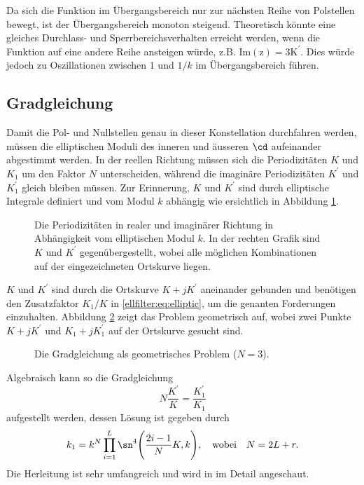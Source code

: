 Da sich die Funktion im Übergangsbereich nur zur nächsten Reihe von Polstellen bewegt, ist der Übergangsbereich monoton steigend.
Theoretisch könnte eine gleiches Durchlass- und Sperrbereichsverhalten erreicht werden, wenn die Funktion auf eine andere Reihe ansteigen würde, z.B. $\mathrm{Im(z) = 3K^\prime}$.
Dies würde jedoch zu Oszillationen zwischen $1$ und $1/k$ im Übergangsbereich führen.

\subsection{Gradgleichung}

Damit die Pol- und Nullstellen genau in dieser Konstellation durchfahren werden, müssen die elliptischen Moduli des inneren und äusseren $\cd$ aufeinander abgestimmt werden.
In der reellen Richtung müssen sich die Periodizitäten $K$ und $K_1$ um den Faktor $N$ unterscheiden, während die imaginäre Periodizitäten $K^\prime$ und $K^\prime_1$ gleich bleiben müssen.
Zur Erinnerung, $K$ und $K^\prime$ sind durch elliptische Integrale definiert und vom Modul $k$ abhängig wie ersichtlich in Abbildung \ref{ellfilter:fig:kprime}.
\begin{figure}
    \centering
    
    \caption{
        Die Periodizitäten in realer und imaginärer Richtung in Abhängigkeit vom elliptischen Modul $k$.
        In der rechten Grafik sind $K$ und $K^\prime$ gegenübergestellt, wobei alle möglichen Kombinationen auf der eingezeichneten Ortskurve liegen.
    }
    \label{ellfilter:fig:kprime}
\end{figure}
$K$ und $K^\prime$ sind durch die Ortskurve $K + jK^\prime$ aneinander gebunden und benötigen den Zusatzfaktor $K_1/K$ in \eqref{ellfilter:eq:elliptic}, um die genanten Forderungen einzuhalten.
Abbildung \ref{ellfilter:fig:degree_eq} zeigt das Problem geometrisch auf, wobei zwei Punkte $K+jK^\prime$ und $K_1+jK_1^\prime$ auf der Ortskurve gesucht sind.
\begin{figure}
    \centering
    
    \caption{Die Gradgleichung als geometrisches Problem ($N=3$).}
    \label{ellfilter:fig:degree_eq}
\end{figure}
Algebraisch kann so die Gradgleichung
\begin{equation}
    N \frac{K^\prime}{K} = \frac{K^\prime_1}{K_1}
\end{equation}
aufgestellt werden, dessen Lösung ist gegeben durch
\begin{equation}\label{ellfilter:eq:degeqsol}
k_1 = k^N \prod_{i=1}^L \sn^4 \Bigg( \frac{2i - 1}{N} K, k \Bigg),
\quad \text{wobei} \quad
N = 2L+r.
\end{equation}
Die Herleitung ist sehr umfangreich und wird in \cite{ellfilter:bib:orfanidis} im Detail angeschaut.

